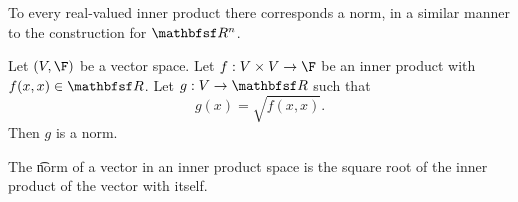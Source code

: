 

To every real-valued inner product there corresponds a norm, in a similar manner to the construction for $\R^n$.


\begin{prop}
Let $(V, \F)$ be a vector space.
Let $f: V \times V \to \F$ be an inner product with $f(x, x) \in \R$.
Let $g: V \to \R$ such that
\[
  g(x) = \sqrt{f(x, x)}.
\]
Then $g$ is a norm.
\end{prop}

The \t{norm} of a vector in an inner product space is the square root of the inner product of the vector with itself.


\blankpage
